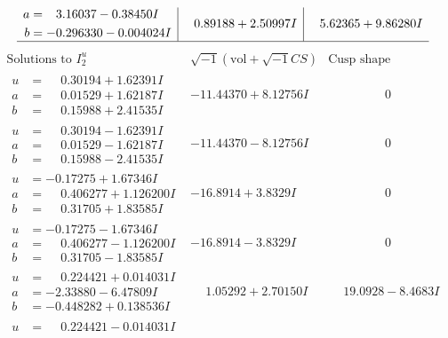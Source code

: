 \documentclass[1p]{elsarticle_modified}
\theoremstyle{definition}
\newcommand{\I}{\sqrt{-1}}
\begin{document}
$$\begin{array}{c|c|c}
\begin{aligned}
a &= \phantom{-}3.16037 - 0.38450 I \\
b &= -0.296330 - 0.004024 I\end{aligned}
 & \phantom{-}0.89188 + 2.50997 I & \phantom{-}5.62365 + 9.86280 I\\
 \hline 
 \end{array}$$\newpage$$\begin{array}{c|c|c}  
\text{Solutions to }I^u_{2}& \I (\text{vol} + \sqrt{-1}CS) & \text{Cusp shape}\\
 \hline 
\begin{aligned}
u &= \phantom{-}0.30194 + 1.62391 I \\
a &= \phantom{-}0.01529 + 1.62187 I \\
b &= \phantom{-}0.15988 + 2.41535 I\end{aligned}
 & -11.44370 + 8.12756 I & \phantom{-0.000000 } 0 \\ \hline\begin{aligned}
u &= \phantom{-}0.30194 - 1.62391 I \\
a &= \phantom{-}0.01529 - 1.62187 I \\
b &= \phantom{-}0.15988 - 2.41535 I\end{aligned}
 & -11.44370 - 8.12756 I & \phantom{-0.000000 } 0 \\ \hline\begin{aligned}
u &= -0.17275 + 1.67346 I \\
a &= \phantom{-}0.406277 + 1.126200 I \\
b &= \phantom{-}0.31705 + 1.83585 I\end{aligned}
 & -16.8914 + 3.8329 I & \phantom{-0.000000 } 0 \\ \hline\begin{aligned}
u &= -0.17275 - 1.67346 I \\
a &= \phantom{-}0.406277 - 1.126200 I \\
b &= \phantom{-}0.31705 - 1.83585 I\end{aligned}
 & -16.8914 - 3.8329 I & \phantom{-0.000000 } 0 \\ \hline\begin{aligned}
u &= \phantom{-}0.224421 + 0.014031 I \\
a &= -2.33880 - 6.47809 I \\
b &= -0.448282 + 0.138536 I\end{aligned}
 & \phantom{-}1.05292 + 2.70150 I & \phantom{-}19.0928 - 8.4683 I \\ \hline\begin{aligned}
u &= \phantom{-}0.224421 - 0.014031 I \\

\end{aligned}
\end{array}$$
\end{document}
